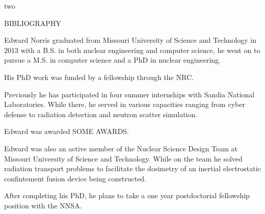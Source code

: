 \documentclass[times,12pt,titlepage]{mstthesis}
\begin{document}
\begin{ThesisBody}



 

\end{ThesisBody}

\begin{ThesisAppendix}{two}



\end{ThesisAppendix}


\begin{ThesisBibliography}{BIBLIOGRAPHY}


\end{ThesisBibliography}


\begin{Vita}
Edward Norris graduated from Missouri University of Science and Technology in 2013 with a B.S. in both nuclear engineering and computer science, he went on to pursue a M.S. in computer science and a PhD in nuclear engineering.

His PhD work was funded by a fellowship through the NRC.

Previously he has participated in four summer internships with Sandia National Laboratories. While there, he served in various capacities ranging from cyber defense to radiation detection and neutron scatter simulation.

Edward was awarded SOME AWARDS.

Edward was also an active member of the Nuclear Science Design Team at Missouri University of Science and Technology. While on the team he solved radiation transport problems to facilitate the dosimetry of an inertial electrostatic confintement fusion device being constructed.

After completing his PhD, he plans to take a one year postdoctorial fellowship position with the NNSA.


\end{Vita}
\end{document}

